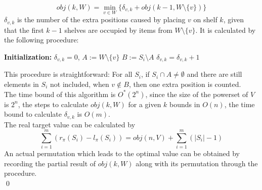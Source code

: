 \documentclass[10pt]{article}
\begin{document}
	\[obj(k, W) = \min_{v \in W}\{\delta_{v,k} + obj(k-1, W \setminus \{v\})\}\]
$\delta_{v,k}$ is the number of the extra positions caused by placing $v$ on shelf $k$, given that the first $k-1$ shelves are occupied by items from $W \setminus \{v\}$. It is calculated by the following procedure:
\begin{algorithmic}
\STATE \textbf{Initialization:} $\delta_{v,k} = 0$, $A := W \setminus \{v\}$
	\STATE $B := S_i \setminus A$
		\STATE $\delta_{v,k} = \delta_{v,k} + 1$
		\ENDIF
	\ENDIF
\ENDFOR
\end{algorithmic}
This procedure is straightforward: For all $S_i$, if $S_i \cap A \neq \emptyset$ and there are still elements in $S_i$ not included, when $v \notin B$, then one extra position is counted.\\
The time bound of this algorithm is $O^{*}(2^n)$, since the size of the powerset of $V$ is $2^{n}$, the steps to calculate $obj(k, W)$ for a given $k$ bounds in $O(n)$, the time bound to calculate $\delta_{v,k}$ is $O(m)$.\\
The real target value can be calculated by 
	\[\sum_{i=1}^{m}(r_{\pi}(S_i) - l_{\pi}(S_i)) = obj(n, V) + \sum_{i=1}^{m}(|S_i| - 1)\]
An actual permutation which leads to the optimal value can be obtained by recording the partial result of $obj(k, W)$ along with its permutation through the procedure.\\
\qed
\end{document}
